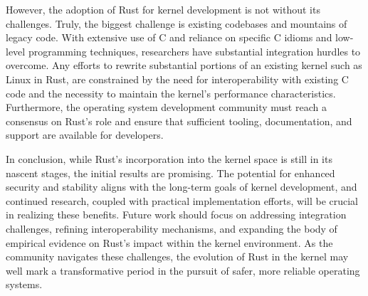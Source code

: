 \documentclass[sigconf]{acmart}
\begin{document}
However, the adoption of Rust for kernel development is not without its challenges. Truly, the
biggest challenge is existing codebases and mountains of legacy code. With extensive use of C and
reliance on specific C idioms and low-level programming techniques, researchers have substantial
integration hurdles to overcome. Any efforts to rewrite substantial portions of an existing kernel
such as Linux in Rust, are constrained by the need for interoperability with existing C code and the
necessity to maintain the kernel's performance characteristics. Furthermore, the operating system
development community must reach a consensus on Rust's role and ensure that sufficient tooling,
documentation, and support are available for developers.

In conclusion, while Rust's incorporation into the kernel space is still in its nascent stages, the
initial results are promising. The potential for enhanced security and stability aligns with the
long-term goals of kernel development, and continued research, coupled with practical implementation
efforts, will be crucial in realizing these benefits. Future work should focus on addressing
integration challenges, refining interoperability mechanisms, and expanding the body of empirical
evidence on Rust's impact within the kernel environment. As the community navigates these
challenges, the evolution of Rust in the kernel may well mark a transformative period in the pursuit
of safer, more reliable operating systems.

\balance



\end{document}
